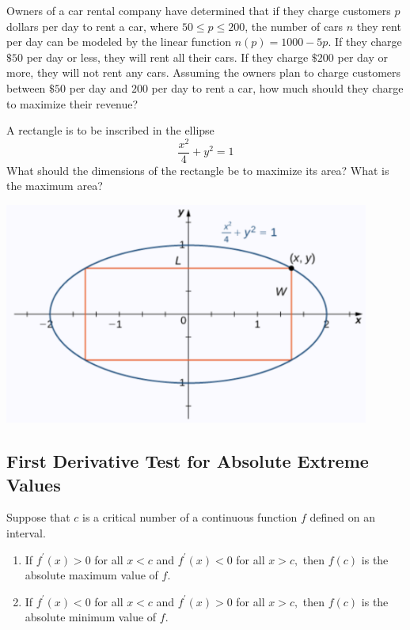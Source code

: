 \begin{example}

Owners of a car rental company have determined that if they charge
customers \(p\) dollars per day to rent a car, where \(50 \le p \le 200\), the
number of cars \(n\) they rent per day can be modeled by the linear
function \(n(p)=1000 - 5p\). If they charge \(\$50\) per day or less, they
will rent all their cars. If they charge \(\$200\) per day or more, they
will not rent any cars. Assuming the owners plan to charge customers
between \(\$50\) per day and \(200\) per day to rent a car, how much
should they charge to maximize their revenue?

\end{example}
\vspace*{6\baselineskip}

\begin{example}

A rectangle is to be inscribed in the ellipse \[\dfrac{x^2}{4}+y^2=1\]
What should the dimensions of the rectangle be to maximize its area?
What is the maximum area?

\includegraphics[width=0.9\textwidth]{img/image-20200420234107555.png}

\end{example}
\vspace*{6\baselineskip}

\hypertarget{first-derivative-test-for-absolute-extreme-values}{%
\subsection{First Derivative Test for Absolute Extreme
Values}\label{first-derivative-test-for-absolute-extreme-values}}

\begin{theorem}

Suppose that \(c\) is a critical number of a continuous function \(f\)
defined on an interval.

\begin{enumerate}
\item
  If \(f^{\prime}(x)>0\) for all \(x<c\) and \(f^{\prime}(x)<0\) for all
  \(x>c,\) then \(f(c)\) is the absolute maximum value of \(f\).
\item
  If \(f^{\prime}(x)<0\) for all \(x<c\) and \(f^{\prime}(x)>0\) for all
  \(x>c,\) then \(f(c)\) is the absolute minimum value of \(f\).
\end{enumerate}

\end{theorem}

